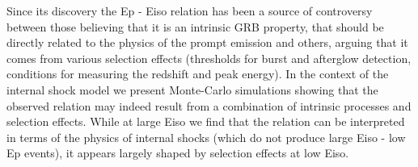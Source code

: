 


\bigskip



\bigskip

\noindent Since its discovery the Ep - Eiso relation has been a source of controversy between those believing that it is an intrinsic GRB property, that should be directly related to the physics of the prompt emission and others, arguing that it comes from various selection effects (thresholds for burst and afterglow detection, conditions for measuring the redshift and peak energy). In the context of the internal shock model we present Monte-Carlo simulations showing that the observed relation may indeed result from a combination of intrinsic processes and selection effects. While at large Eiso we find that the relation can be interpreted in terms of the physics of internal shocks (which do not produce large Eiso - low Ep events), it appears largely shaped by selection effects at low Eiso.
